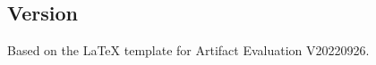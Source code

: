 \documentclass[sigconf]{acmart}
\begin{document}
	
	\subsection{Version}
	Based on the LaTeX template for Artifact Evaluation V20220926.
	
	
	
	
	
\end{document}
